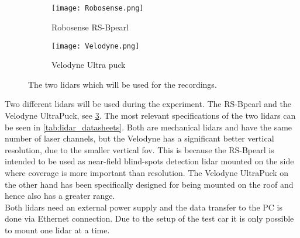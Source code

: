 \subsection{}
\begin{figure}[htbp]
	\centering
	\begin{subfigure}{0.4\textwidth}
		\centering
		\texttt{[image: Robosense.png]}
		\caption{Robosense RS-Bpearl \cite{RoboSense2020}}
		\label{fig:lidar_robosense}
	\end{subfigure}
	\begin{subfigure}{0.4\textwidth}
		\centering
		\texttt{[image: Velodyne.png]}
		\caption{Velodyne Ultra puck \cite{Velodyne2018}}
		\label{fig:lidar_velodyne}
	\end{subfigure}
	\caption{The two \glspl{lidar} which will be used for the recordings.}
	\label{fig:lidars_used}
\end{figure}
Two different \glspl{lidar} will be used during the experiment.
The RS-Bpearl and the Velodyne UltraPuck, see \cref{fig:lidars_used}.
The most relevant specifications of the two \glspl{lidar} can be seen in \cref{tab:lidar_datasheets}.
Both are mechanical \glspl{lidar} and have the same number of laser channels, but the Velodyne has a significant better vertical resolution, due to the smaller vertical \gls{fov}.
This is because the RS-Bpearl is intended to be used as near-field blind-spots detection \gls{lidar} mounted on the side where coverage is more important than resolution.
The Velodyne UltraPuck on the other hand has been specifically designed for being mounted on the roof and hence also has a greater range.\\
Both \glspl{lidar} need an external power supply and the data transfer to the PC is done via Ethernet connection.
Due to the setup of the test car it is only possible to mount one \gls{lidar} at a time.
